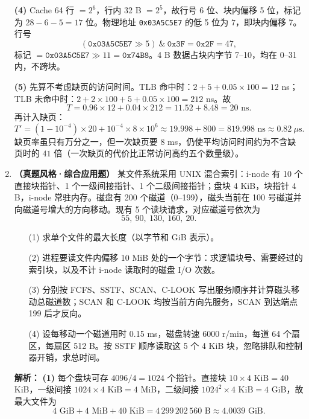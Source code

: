\begin{enumerate}[resume]
\textbf{(4)} Cache 64 行 $=2^6$，行内 32 B $=2^5$，故行号 6 位、块内偏移 5 位，标记为 $28-6-5=17$ 位。物理地址 \texttt{0x03A5C5E7} 的低 5 位为 $7$，即块内偏移 7。行号
\[
(\texttt{0x03A5C5E7}\gg5)\ \&\ \texttt{0x3F}=\texttt{0x2F}=47,
\]
标记 $=\texttt{0x03A5C5E7}\gg11=\texttt{0x74B8}$。4 B 数据占块内字节 7--10，均在 0--31 内，不跨块。

\textbf{(5)} 先算不考虑缺页的访问时间。TLB 命中时：$2+5+0.05\times100=12$ ns；TLB 未命中时：$2+2\times100+5+0.05\times100=212$ ns。故
\[
T=0.96\times12+0.04\times212=11.52+8.48=20\text{ ns}.
\]
再计入缺页：
\[
T'=(1-10^{-4})\times20+10^{-4}\times8\times10^{6}
\approx 19.998+800=819.998\text{ ns}\approx0.82\ \mu\text{s}.
\]
缺页率虽只有万分之一，但一次缺页要 8 ms，仍使平均访问时间约为不含缺页时的 $41$ 倍（一次缺页的代价比正常访问高约五个数量级）。\par\noindent{}\else \answerarea[16] \fi

\item \textbf{（真题风格·综合应用题）} 某文件系统采用 UNIX 混合索引：i-node 有 10 个直接块指针、1 个一级间接指针、1 个二级间接指针；盘块 4 KiB，块指针 4 B，i-node 常驻内存。磁盘有 200 个磁道（0--199），磁头当前在 100 号磁道并向磁道号增大的方向移动。现有 5 个读块请求，对应磁道号依次为
\[
55,\ 90,\ 130,\ 160,\ 20.
\]
\begin{enumerate}
\item[(1)] 求单个文件的最大长度（以字节和 GiB 表示）。
\item[(2)] 进程要读文件内偏移 10 MiB 处的一个字节：求逻辑块号、需要经过的索引块，以及不计 i-node 读取时的磁盘 I/O 次数。
\item[(3)] 分别按 FCFS、SSTF、SCAN、C-LOOK 写出服务顺序并计算磁头移动总磁道数；SCAN 和 C-LOOK 均按当前方向先服务，SCAN 到达端点 199 后才反向。
\item[(4)] 设每移动一个磁道用时 0.15 ms，磁盘转速 6000 r/min，每道 64 个扇区，每扇区 512 B。按 SSTF 顺序读取这 5 个 4 KiB 块，忽略排队和控制器开销，求总时间。
\end{enumerate}

\ifshowsolutions\par\noindent\textbf{解析：}
\textbf{(1)} 每个盘块可存 $4096/4=1024$ 个指针。直接块 $10\times4\text{ KiB}=40$ KiB，一级间接 $1024\times4\text{ KiB}=4$ MiB，二级间接 $1024^2\times4\text{ KiB}=4$ GiB，故最大文件为
\[
4\text{ GiB}+4\text{ MiB}+40\text{ KiB}=4\,299\,202\,560\text{ B}\approx4.0039\text{ GiB}.
\]


\end{enumerate}
